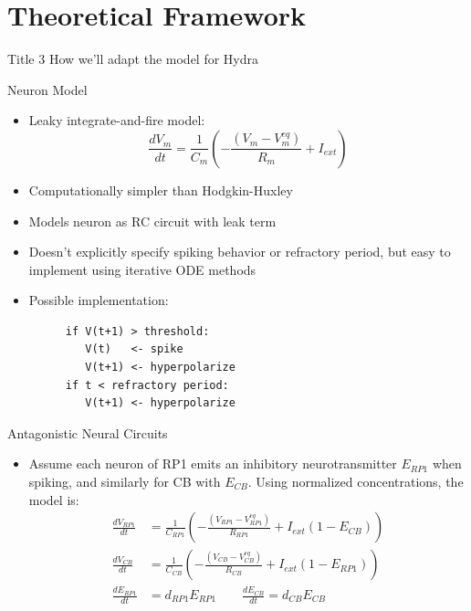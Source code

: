 \documentclass[leqno,presentation,unknownkeysallowed]{beamer}
\begin{document}
\section{Theoretical Framework}

\begin{frame}{Title 3}
How we'll adapt the model for Hydra
\end{frame}

\begin{frame}[fragile]{Neuron Model}
\begin{itemize}
\item Leaky integrate-and-fire model:
\begin{equation*}
\frac{dV_{m}}{dt}=\frac{1}{C_{m}}\left(-\frac{(V_{m}-V_{m}^{eq})}{R_{m}}+I_{ext}\right)
\end{equation*}
\item Computationally simpler than Hodgkin-Huxley
\item Models neuron as RC circuit with leak term
\item Doesn't explicitly specify spiking behavior or refractory period, but easy to implement using iterative ODE methods
\item Possible implementation:
\begin{figure}
\begin{BVerbatim}[fontsize=\scriptsize]
if V(t+1) > threshold:
   V(t)   <- spike
   V(t+1) <- hyperpolarize
if t < refractory period:
   V(t+1) <- hyperpolarize
\end{BVerbatim}
\end{figure}
\end{itemize}
\end{frame}

\begin{frame}{Antagonistic Neural Circuits}
\begin{itemize}
\item Assume each neuron of RP1 emits an inhibitory neurotransmitter $E_{RP1}$ when spiking, and similarly for CB with $E_{CB}$. Using normalized concentrations, the model is:
\begin{align*}
\frac{dV_{RP1}}{dt}&=\frac{1}{C_{RP1}}\left(-\frac{(V_{RP1}-V_{RP1}^{eq})}{R_{RP1}}+I_{ext}\left(1-E_{CB}\right)\right)\\
\frac{dV_{CB}}{dt}&=\frac{1}{C_{CB}}\left(-\frac{(V_{CB}-V_{CB}^{eq})}{R_{CB}}+I_{ext}\left(1-E_{RP1}\right)\right)\\
\frac{dE_{RP1}}{dt}&=d_{RP1}E_{RP1}\hspace{2em}\frac{dE_{CB}}{dt}=d_{CB}E_{CB}
\end{align*}
\end{itemize}
\end{frame}
\end{document}
